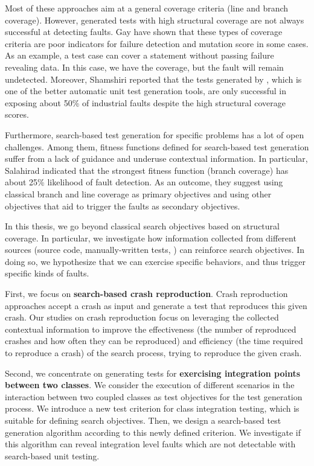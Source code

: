 Most of these approaches aim at a general coverage criteria (\eg line and branch coverage). However,  generated tests with high structural coverage are not always successful at detecting faults. Gay \etal \cite{gay2015risks} have shown that these types of coverage criteria are poor indicators for failure detection and mutation score in some cases. As an example, a test case can cover a statement without passing failure revealing data. In this case, we have the coverage, but the fault will remain undetected.
Moreover, Shamshiri \etal \cite{Shamshiri2016} reported that the tests generated by \evosuite, which is one of the better automatic unit test generation tools, are only successful in exposing about 50\% of industrial faults despite the high structural coverage scores. 

Furthermore, search-based test generation for specific problems has a lot of open challenges. Among them, fitness functions defined for search-based test generation suffer from a lack of guidance and underuse contextual information.  
In particular, Salahirad \etal \cite{Salahirad2019} indicated that the strongest fitness function (branch coverage) has about 25\% likelihood of fault detection.
As an outcome, they suggest using classical branch and line coverage as primary objectives and using other objectives that aid to trigger the faults as secondary objectives.

In this thesis, we go beyond classical search objectives based on structural coverage. In particular, we investigate how information collected from different sources (\ie source code, manually-written tests, \etc) can reinforce search objectives. In doing so, we hypothesize that we can exercise specific behaviors, and thus trigger specific kinds of faults.


First, we focus on \textbf{search-based crash reproduction}. Crash reproduction approaches \cite{Soltani2018a, BPT17concrash, Chen2015, Nayrolles2017, Rossler2013, Xuan2015} accept a crash as input and generate a test that reproduces this given crash. Our studies on crash reproduction focus on leveraging the collected contextual information to improve the effectiveness (\ie the number of reproduced crashes and how often they can be reproduced) and efficiency (\ie the time required to reproduce a crash) of the search process, trying to reproduce the given crash.

Second, we concentrate on generating tests for \textbf{exercising integration points between two classes}. We consider the execution of different scenarios in the interaction between two coupled classes as test objectives for the test generation process. We introduce a new test criterion for class integration testing, which is suitable for defining search objectives. Then, we design a search-based test generation algorithm according to this newly defined criterion. We investigate if this algorithm can reveal integration level faults which are not detectable with search-based unit testing.

